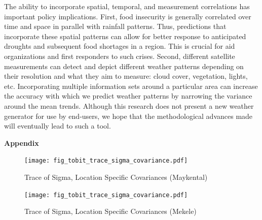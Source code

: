 \documentclass[12pt]{article}
\begin{document}
The ability to incorporate spatial, temporal, and measurement correlations has important policy implications. First, food insecurity is generally correlated over time and space in parallel with rainfall patterns. Thus, predictions that incorporate these spatial patterns can allow for better response to anticipated droughts and subsequent food shortages in a region. This is crucial for aid organizations and first responders to such crises. Second, different satellite measurements can detect and depict different weather patterns depending on their resolution and what they aim to measure: cloud cover, vegetation, lights, etc. Incorporating multiple information sets around a particular area can increase the accuracy with which we predict weather patterns by narrowing the variance around the mean trends. Although this research does not present a new weather generator for use by end-users, we hope that the methodological advances made will eventually lead to such a tool. 





\newpage
\small\normalsize
%




\newpage
\textbf{Appendix}


\begin{figure}[htbp]
\caption{Trace of Sigma, Location Specific Covariances (Maykental) }
\begin{center}
\texttt{[image: fig\_tobit\_trace\_sigma\_covariance.pdf]}     
\end{center}
\end{figure}

\begin{figure}[htbp]
\caption{Trace of Sigma, Location Specific Covariances (Mekele) }
\begin{center}
\texttt{[image: fig\_tobit\_trace\_sigma\_covariance.pdf]}     
\end{center}
\end{figure}
\end{document}
